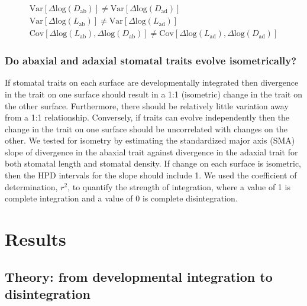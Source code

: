 \documentclass[
  12pt,
]{article}
\begin{document}
\begin{gather}\label{eq:prediction1}
\text{Var}[\Delta \text{log}(D_\text{ab})] \ne \text{Var}[\Delta \text{log}(D_\text{ad})] \\
\text{Var}[\Delta \text{log}(L_\text{ab})] \ne \text{Var}[\Delta \text{log}(L_\text{ad})] \\
\text{Cov}[\Delta \text{log}(L_\text{ab}), \Delta \text{log}(D_\text{ab})] \ne \text{Cov}[\Delta \text{log}(L_\text{ad}), \Delta \text{log}(D_\text{ad})]
\end{gather}

\hypertarget{do-abaxial-and-adaxial-stomatal-traits-evolve-isometrically}{%
\subsubsection{Do abaxial and adaxial stomatal traits evolve isometrically?}\label{do-abaxial-and-adaxial-stomatal-traits-evolve-isometrically}}

If stomatal traits on each surface are developmentally integrated then divergence in the trait on one surface should result in a 1:1 (isometric) change in the trait on the other surface. Furthermore, there should be relatively little variation away from a 1:1 relationship. Conversely, if traits can evolve independently then the change in the trait on one surface should be uncorrelated with changes on the other. We tested for isometry by estimating the standardized major axis (SMA) slope of divergence in the abaxial trait against divergence in the adaxial trait for both stomatal length and stomatal density. If change on each surface is isometric, then the HPD intervals for the slope should include 1. We used the coefficient of determination, \(r^2\), to quantify the strength of integration, where a value of 1 is complete integration and a value of 0 is complete disintegration.

\hypertarget{results}{%
\section{Results}\label{results}}

\hypertarget{theory-from-developmental-integration-to-disintegration}{%
\subsection{Theory: from developmental integration to disintegration}\label{theory-from-developmental-integration-to-disintegration}}
\end{document}
